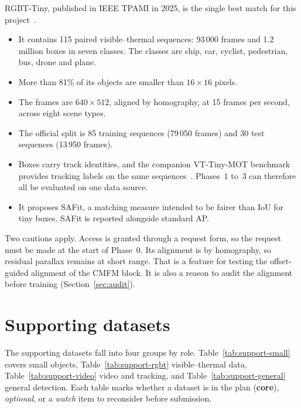 RGBT-Tiny, published in IEEE TPAMI in 2025, is the single best match for
this project~\citep{ying2025rgbttiny}.
\begin{itemize}
  \item It contains 115 paired visible--thermal sequences: 93\,000 frames
        and 1.2 million boxes in seven classes. The classes are ship, car,
        cyclist, pedestrian, bus, drone and plane.
  \item More than 81\% of its objects are smaller than $16\times16$ pixels.
  \item The frames are $640\times512$, aligned by homography, at 15 frames per
        second, across eight scene types.
  \item The official split is 85 training sequences (79\,050 frames) and 30
        test sequences (13\,950 frames).
  \item Boxes carry track identities, and the companion VT-Tiny-MOT
        benchmark provides tracking labels on the same
        sequences~\citep{hgttrack2024}. Phases~1 to~3 can therefore all be
        evaluated on one data source.
  \item It proposes SAFit, a matching measure intended to be fairer than IoU
        for tiny boxes. SAFit is reported alongside standard AP.
\end{itemize}

Two cautions apply. Access is granted through a request form, so the
request must be made at the start of Phase~0. Its alignment is by
homography, so residual parallax remains at short range. That is a feature
for testing the offset-guided alignment of the CMFM block. It is also a
reason to audit the alignment before training (Section~\ref{sec:audit}).

\section{Supporting datasets}

The supporting datasets fall into four groups by role.
Table~\ref{tab:support-small} covers small objects,
Table~\ref{tab:support-rgbt} visible--thermal data,
Table~\ref{tab:support-video} video and tracking, and
Table~\ref{tab:support-general} general detection. Each table marks whether a
dataset is in the plan (\textbf{core}), \emph{optional}, or a \emph{watch}
item to reconsider before submission.

